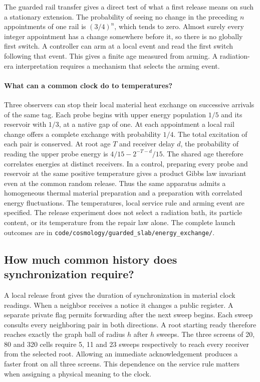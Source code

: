 \documentclass[11pt]{article}
\theoremstyle{remark}
\theoremstyle{plain}
\newcommand{\pathref}[1]{\nolinkurl{#1}}
\begin{document}
The guarded rail transfer gives a direct test of what a first release means
on such a stationary extension. The probability of seeing no change in
the preceding \(n\) appointments of one rail is \((3/4)^n\), which tends
to zero. Almost surely every integer appointment has a change somewhere
before it, so there is no globally first switch. A controller can arm at a
local event and read the first switch following that event. This gives a
finite age measured from arming. A radiation-era interpretation
requires a mechanism that selects the arming event.

\paragraph{What can a common clock do to temperatures?}
Three observers can stop their local material heat exchange on successive
arrivals of the same tag. Each probe begins with upper energy population
\(1/5\) and its reservoir with \(1/3\), at a native gap of one. At each
appointment a local rail change offers a complete exchange with probability
\(1/4\). The total excitation of each pair is conserved. At root age \(T\)
and receiver delay \(d\), the probability of reading the upper probe energy
is \(4/15-2^{-T-d}/15\). The shared age therefore correlates energies at
distinct receivers. In a control, preparing every probe and reservoir at
the same positive temperature gives a product Gibbs law invariant even at
the common random release. Thus the same apparatus admits a homogeneous
thermal material preparation and a preparation with correlated energy
fluctuations. The temperatures, local service rule and arming event are
specified. The release experiment does not select a radiation bath, its
particle content, or its temperature from the repair law alone. The complete
launch outcomes are in \pathref{code/cosmology/guarded_slab/energy_exchange/}.

\subsection{How much common history does synchronization require?}

A local release front gives the duration of synchronization in material
clock readings. When a neighbor receives a notice it changes a public
register. A separate private flag permits forwarding after the next sweep
begins. Each sweep consults every neighboring pair in both directions.
A root starting ready therefore reaches exactly the graph ball of radius
\(h\) after \(h\) sweeps. The three screens of 20, 80 and 320 cells require
5, 11 and 23 sweeps respectively to reach every receiver from the selected
root. Allowing an immediate acknowledgement produces a faster front on all
three screens. This dependence on the service rule matters when assigning
a physical meaning to the clock.
\end{document}

